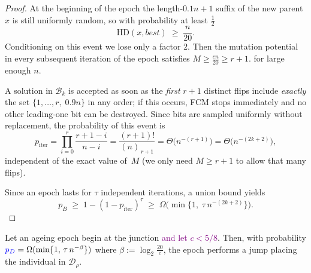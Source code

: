 \begin{proof}
	At the beginning of the epoch %
	the length-\(0.1n+1\) suffix of the new parent \(x\) is still uniformly random,
	so with probability at least \(\tfrac12\)
	\[
	\mathrm{HD}(x,best)\;\ge\;\frac{n}{20}.
	\]
	Conditioning on this event we lose only a factor \(2\).
	Then the mutation potential in every subsequent
	iteration of the epoch satisfies
	\(
	M\ge \tfrac{cn}{20}  \geq r+1.
	\) for large enough $n$.
	
	A solution in $\mathcal{B}_k$ is accepted as soon as the \emph{first} $r{+}1$ distinct flips
	include \emph{exactly} the set
	\(\{1,\dots,r,\;0.9n\}\)
	in any order; if this occurs, FCM stops immediately and no other
	leading-one bit can be destroyed.
	Since bits are sampled uniformly without replacement, the probability of
	this event is
	\[
	p_{\text{iter}}
	=\prod_{i=0}^{r}\frac{r+1-i}{n-i}
	=\frac{(r+1)!}{(n)_{\,r+1}}
	=\Theta\!\bigl(n^{-(r+1)}\bigr)
	=\Theta\!\bigl(n^{-(2k+2)}\bigr),
	\]
	independent of the exact value of~$M$ (we only need $M\ge r{+}1$ to allow that
	many flips).
	
	Since an epoch lasts for \(\tau\) independent iterations, a union bound yields
	\[
	p_B
	\;\ge\;
	1-(1-p_{\text{iter}})^{\tau}
	\;\ge\;
	\Omega\!\bigl(\min\{1,\;\tau\,n^{-(2k+2)}\}\bigr).
	\]
	
	\noindent
\end{proof}
\begin{lemma} 
	Let an ageing epoch begin at the junction \textcolor{purple}{and let $c <5/8$}.
	Then, with probability $\textcolor{blue}{p_D}=\Omega(\min\{1,\,\tau\,n^{-\beta}\})$ where $\beta:=\log_2 \frac{20}{c}$, the epoch performs a jump placing the individual in $\mathcal{D}_\rho$.
\end{lemma}

